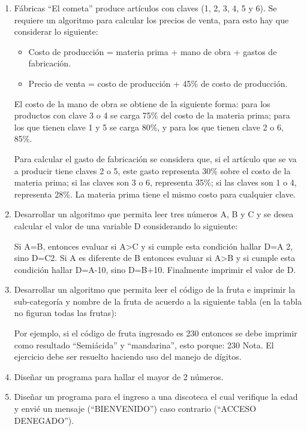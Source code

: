 \documentclass{scrartcl}
\begin{document}
\begin{enumerate}
		\item Fábricas “El cometa” produce artículos con claves (1, 2, 3, 4, 5 y 6). Se requiere un algoritmo para calcular los precios de venta, para esto hay que considerar lo siguiente:
		
			\begin{itemize}
				\item Costo de producción = materia prima + mano de obra + gastos de fabricación.
				\item Precio de venta = costo de producción + 45\% de costo de producción.
			\end{itemize}
		
		El costo de la mano de obra se obtiene de la siguiente forma: para los productos con clave 3 o 4 se carga 75\% del costo de la materia prima; para los que tienen clave 1 y 5 se carga 80\%, y para los que tienen clave 2 o 6, 85\%.
		
		Para calcular el gasto de fabricación se considera que, si el artículo que se va a producir tiene claves 2 o 5, este gasto representa 30\% sobre el costo de la materia prima; si las claves son 3 o 6, representa 35\%; si las claves son 1 o 4, representa 28\%. La materia prima tiene el mismo costo para cualquier clave.
		
		\item Desarrollar un algoritmo que permita leer tres números A, B y C y se desea calcular el valor de una variable D considerando lo siguiente:
		
		Si A=B, entonces evaluar si A>C y si cumple esta condición hallar D=A 2, sino D=C2. Si A es diferente de B entonces evaluar si A>B y si cumple esta condición hallar D=A-10, sino D=B+10. Finalmente imprimir el valor de D.
		
		\item Desarrollar un algoritmo que permita leer el código de la fruta e imprimir la sub-categoría y nombre de la fruta de acuerdo a la siguiente tabla (en la tabla no figuran todas las frutas):
		
		Por ejemplo, si el código de fruta ingresado es 230 entonces se debe imprimir como
		resultado “Semiácida” y “mandarina”, esto porque:
		230
		Nota. El ejercicio debe ser resuelto haciendo uso del manejo de dígitos.
		
		\item Diseñar un programa para hallar el mayor de 2 números.

		\item Diseñar un programa para el ingreso a una discoteca el cual verifique la edad y envié un mensaje (“BIENVENIDO”) caso contrario (“ACCESO DENEGADO”).
		

\end{enumerate}
\end{document}
